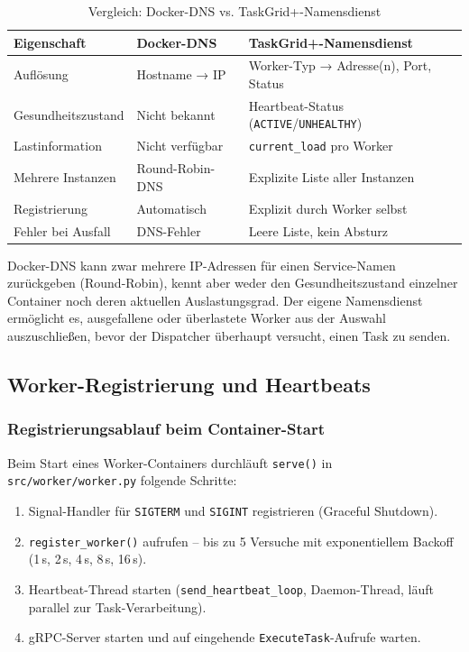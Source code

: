 \begin{table}[H]
\centering
\begin{tabular}{m{4.5cm} m{4.5cm} m{4.5cm}}
\toprule
\textbf{Eigenschaft} & \textbf{Docker-DNS} & \textbf{TaskGrid+-Namensdienst} \\
\midrule
Auflösung           & Hostname → IP       & Worker-Typ → Adresse(n), Port, Status \\
Gesundheitszustand  & Nicht bekannt       & Heartbeat-Status (\texttt{ACTIVE}/\texttt{UNHEALTHY}) \\
Lastinformation     & Nicht verfügbar     & \texttt{current\_load} pro Worker \\
Mehrere Instanzen   & Round-Robin-DNS     & Explizite Liste aller Instanzen \\
Registrierung       & Automatisch         & Explizit durch Worker selbst \\
Fehler bei Ausfall  & DNS-Fehler          & Leere Liste, kein Absturz \\
\bottomrule
\end{tabular}
\caption{Vergleich: Docker-DNS vs. TaskGrid+-Namensdienst}
\end{table}

\noindent Docker-DNS kann zwar mehrere IP-Adressen für einen Service-Namen
zurückgeben (Round-Robin), kennt aber weder den Gesundheitszustand
einzelner Container noch deren aktuellen Auslastungsgrad.
Der eigene Namensdienst ermöglicht es, ausgefallene oder überlastete
Worker aus der Auswahl auszuschließen, bevor der Dispatcher überhaupt
versucht, einen Task zu senden.

\subsection{Worker-Registrierung und Heartbeats}
\label{sec:nd-heartbeat}

\subsubsection*{Registrierungsablauf beim Container-Start}

Beim Start eines Worker-Containers durchläuft \texttt{serve()} in
\texttt{src/worker/worker.py} folgende Schritte:

\begin{enumerate}
  \item Signal-Handler für \texttt{SIGTERM} und \texttt{SIGINT} registrieren
        (Graceful Shutdown).
  \item \texttt{register\_worker()} aufrufen -- bis zu 5 Versuche mit
        exponentiellem Backoff (1\,s, 2\,s, 4\,s, 8\,s, 16\,s).
  \item Heartbeat-Thread starten (\texttt{send\_heartbeat\_loop},
        Daemon-Thread, läuft parallel zur Task-Verarbeitung).
  \item gRPC-Server starten und auf eingehende \texttt{ExecuteTask}-Aufrufe
        warten.
\end{enumerate}

